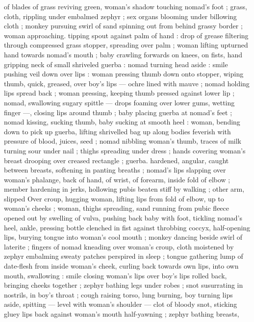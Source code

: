 {of blades of grass reviving green, woman's shadow touching 
nomad's foot ; grass, cloth, rippling under embalmed zephyr ; sex 
organs blooming under billowing cloth ; monkey pursuing swirl of 
sand spinning out from behind grassy border ; woman approaching. 
tipping spout against palm of hand : drop of grease filtering through 
compressed grass stopper, spreading over palm ; woman lifting 
upturned hand towards nomad's mouth ; baby crawling forwards on 
knees, on fists, hand gripping neck of small shriveled guerba : 
nomad turning head aside : smile pushing veil down over lips : 
woman pressing thumb down onto stopper, wiping thumb, quick, 
greased, over boy's lips --- ochre lined with mauve ; nomad holding 
lips spread back ; woman pressing, keeping thumb pressed against 
lower lip ; nomad, swallowing sugary spittle --- drops foaming over 
lower gums, wetting finger ---, closing lips around thumb ; baby 
placing guerba at nomad's feet ; nomad kissing, sucking thumb, baby 
sucking at smooth heel : woman, bending down to pick up guerba, 
lifting shrivelled bag up along bodies feverish with pressure of 
blood, juices, seed ; nomad nibbling woman's thumb, traces of milk 
turning sour under nail ; thighs spreading under dress ; hands 
covering woman's breast drooping over creased rectangle ; guerba. 
hardened, angular, caught between breasts, softening in panting 
breaths ; nomad's lips slapping over woman's phalange, back of 
hand, of wrist, of forearm, inside fold of elbow ; member hardening 
in jerks, hollowing pubis beaten stiff by walking ; other arm, slipped 
Over croup, hugging woman, lifting lips from fold of elbow, up to 
woman's cheeks ; woman, thighs spreading, sand running from pubic 
fleece opened out by swelling of vulva, pushing back baby with foot, 
tickling nomad's heel, ankle, pressing bottle clenched in fist against 
throbbing coccyx, half-opening lips, burying tongue into woman's 
cool mouth ; monkey dancing beside swirl of laterite ; fingers of 
nomad kneading over woman's croup, cloth moistened by zephyr 
embalming sweaty patches perspired in sleep ; tongue gathering 
lump of date-flesh from inside woman's cheek, curling back towards 
own lips, into own mouth, swallowing : smile closing woman's lips 
over boy's lips rolled back, bringing cheeks together ; zephyr bathing 
legs under robes ; snot susurrating in nostrils, in boy's throat ; cough 
raising torso, lung burning, boy turning lips aside, spitting --- level 
with woman's shoulder --- clot of bloody snot, sticking gluey lips 
back against woman's mouth half-yawning ; zephyr bathing breasts, 
}
